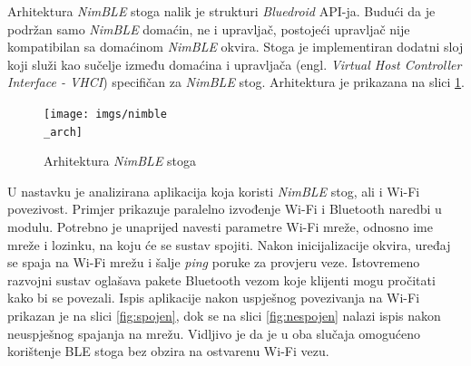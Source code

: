 Arhitektura \textit{NimBLE} stoga nalik je strukturi \textit{Bluedroid} API-ja. Budući da je podržan samo \textit{NimBLE} domaćin, ne i upravljač, postojeći upravljač nije kompatibilan sa domaćinom \textit{NimBLE} okvira. Stoga je implementiran dodatni sloj koji služi kao sučelje između domaćina i upravljača (engl. \textit{Virtual Host Controller Interface - VHCI}) specifičan za \textit{NimBLE} stog. Arhitektura je prikazana na slici \ref{fig:nimble_arch}. 

\begin{figure}[ht]
	\centering
	\texttt{[image: imgs/nimble\\\_arch]}
	\caption{Arhitektura \textit{NimBLE} stoga \cite{esp_bt_api}}
	\label{fig:nimble_arch}
\end{figure}

U nastavku je analizirana aplikacija koja koristi \textit{NimBLE} stog, ali i Wi-Fi povezivost. Primjer prikazuje paralelno izvođenje Wi-Fi i Bluetooth naredbi u modulu. Potrebno je unaprijed navesti parametre Wi-Fi mreže, odnosno ime mreže i lozinku, na koju će se sustav spojiti. Nakon inicijalizacije okvira, uređaj se spaja na Wi-Fi mrežu i šalje \textit{ping} poruke za provjeru veze. Istovremeno razvojni sustav oglašava pakete Bluetooth vezom koje klijenti mogu pročitati kako bi se povezali. Ispis aplikacije nakon uspješnog povezivanja na Wi-Fi prikazan je na slici \ref{fig:spojen}, dok se na slici \ref{fig:nespojen} nalazi ispis nakon neuspješnog spajanja na mrežu. Vidljivo je da je u oba slučaja omogućeno korištenje BLE stoga bez obzira na ostvarenu Wi-Fi vezu.

